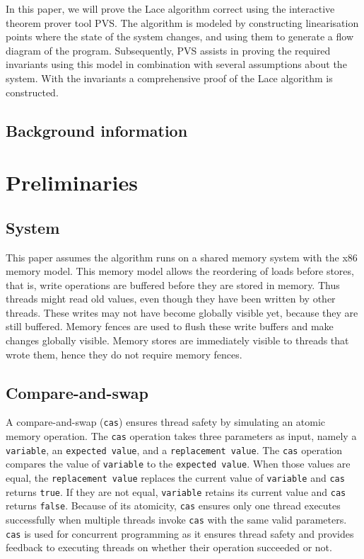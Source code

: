 \documentclass{sig-alternate-br}
\begin{document}
In this paper, we will prove the Lace algorithm correct using the interactive theorem prover tool PVS.
The algorithm is modeled by constructing linearisation points where the state of the system changes, and using them to generate a flow diagram of the program.
Subsequently, PVS assists in proving the required invariants using this model in combination with several assumptions about the system.
With the invariants a comprehensive proof of the Lace algorithm is constructed.

\subsection{Background information}

\section{Preliminaries}
\subsection{System}
This paper assumes the algorithm runs on a shared memory system with the x86 memory model.
This memory model allows the reordering of loads before stores, that is, write operations are buffered before they are stored in memory.
Thus threads might read old values, even though they have been written by other threads.
These writes may not have become globally visible yet, because they are still buffered.
Memory fences are used to flush these write buffers and make changes globally visible.
Memory stores are immediately visible to threads that wrote them, hence they do not require memory fences.

\subsection{Compare-and-swap}
A compare-and-swap (\texttt{cas}) ensures thread safety by simulating an atomic memory operation.
The \texttt{cas} operation takes three parameters as input, namely a \texttt{variable}, an \texttt{expected value}, and a \texttt{replacement value}.
The \texttt{cas} operation compares the value of \texttt{variable} to the \texttt{expected value}. When those values are equal, the \texttt{replacement value} replaces the current value of \texttt{variable} and \texttt{cas} returns \texttt{true}.
If they are not equal, \texttt{variable} retains its current value and \texttt{cas} returns \texttt{false}.
Because of its atomicity, \texttt{cas} ensures only one thread executes successfully when multiple threads invoke \texttt{cas} with the same valid parameters.
\texttt{cas} is used for concurrent programming as it ensures thread safety and provides feedback to executing threads on whether their operation succeeded or not.
\end{document}
